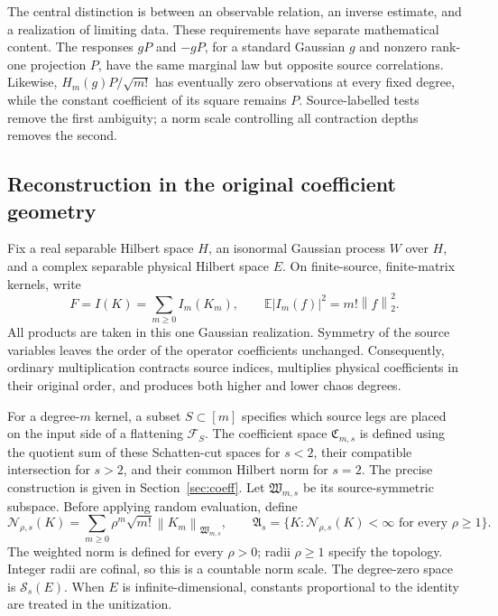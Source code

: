\documentclass[11pt,a4paper]{amsart}
\numberwithin{equation}{section}
\theoremstyle{definition}
\theoremstyle{remark}
\newcommand{\E}{\mathbb E}
\newcommand{\Sch}{\mathcal S}
\newcommand{\Coeff}{\mathfrak C}
\newcommand{\Wc}{\mathfrak W}
\newcommand{\Alg}{\mathfrak A}
\newcommand{\Flat}{\mathcal F}
\newcommand{\norm}[1]{\left\lVert#1\right\rVert}
\newcommand{\Nn}[2]{\mathcal N_{#1,s}(#2)}
\begin{document}
The central distinction is between an observable relation, an inverse estimate, and a realization of limiting data. These requirements have separate mathematical content. The responses $gP$ and $-gP$, for a standard Gaussian $g$ and nonzero rank-one projection $P$, have the same marginal law but opposite source correlations. Likewise, $H_m(g)P/\sqrt{m!}$ has eventually zero observations at every fixed degree, while the constant coefficient of its square remains $P$. Source-labelled tests remove the first ambiguity; a norm scale controlling all contraction depths removes the second.

\subsection{Reconstruction in the original coefficient geometry}
Fix a real separable Hilbert space $H$, an isonormal Gaussian process $W$ over $H$, and a complex separable physical Hilbert space $E$. On finite-source, finite-matrix kernels, write
\begin{equation}\label{eq:intro-eval}
 F=I(K)=\sum_{m\ge0}I_m(K_m),\qquad
 \E|I_m(f)|^2=m!\norm f_2^2.
\end{equation}
All products are taken in this one Gaussian realization. Symmetry of the source variables leaves the order of the operator coefficients unchanged. Consequently, ordinary multiplication contracts source indices, multiplies physical coefficients in their original order, and produces both higher and lower chaos degrees.

For a degree-$m$ kernel, a subset $S\subset[m]$ specifies which source legs are placed on the input side of a flattening $\Flat_S$. The coefficient space $\Coeff_{m,s}$ is defined using the quotient sum of these Schatten-cut spaces for $s<2$, their compatible intersection for $s>2$, and their common Hilbert norm for $s=2$. The precise construction is given in Section~\ref{sec:coeff}. Let $\Wc_{m,s}$ be its source-symmetric subspace. Before applying random evaluation, define
\begin{equation}\label{eq:intro-scale}
 \Nn\rho K=\sum_{m\ge0}\rho^m\sqrt{m!}\norm{K_m}_{\Wc_{m,s}},\qquad
 \Alg_s=\{K:\Nn\rho K<\infty\text{ for every }\rho\ge1\}.
\end{equation}
The weighted norm is defined for every $\rho>0$; radii $\rho\ge1$ specify the topology. Integer radii are cofinal, so this is a countable norm scale. The degree-zero space is $\Sch_s(E)$. When $E$ is infinite-dimensional, constants proportional to the identity are treated in the unitization.
\end{document}
